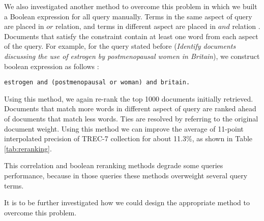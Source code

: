 We also investigated another method to overcome this problem in which  we built a Boolean expression for all query manually. Terms in the same aspect of query are placed in $or$ relation, and terms in different aspect are placed in $and$ relation \cite{hearst96}. Documents that satisfy the constraint contain at least one word from each aspect of the query. For example, for the query stated before ({\it Identify documents discussing the use of estrogen by postmenopausal women in Britain}), we construct boolean expression as follows :
\begin{verbatim}
estrogen and (postmenopausal or woman) and britain.
\end{verbatim}
Using this method, we again re-rank the top 1000 documents initially retrieved. Documents that match more words in different aspect of query are ranked ahead of documents that match less words. 
Ties are resolved by referring to the original document weight. Using this method we can improve the average of 11-point interpolated precision of TREC-7 collection for about 11.3\%, as shown in Table \ref{tab:reranking}. 

This correlation and boolean reranking methods degrade some queries performance, because in those queries these methods overweight several query terms.

It is to be further investigated how we could design the appropriate method to overcome this problem. 

